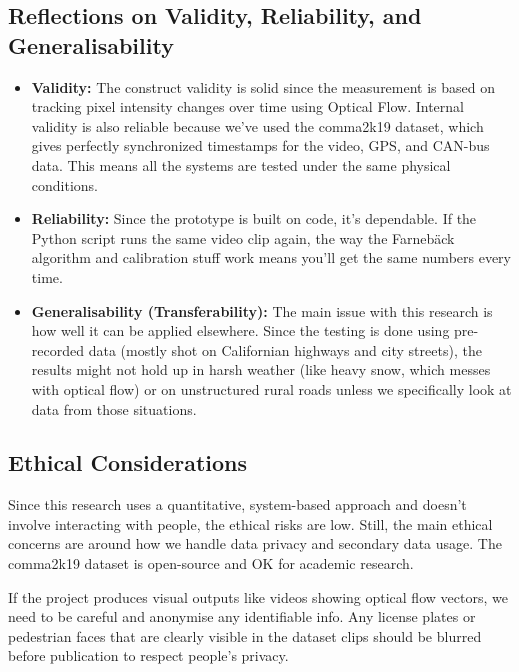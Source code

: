 \subsection{Reflections on Validity, Reliability, and Generalisability}
\begin{itemize}
    \item \textbf{Validity:} The construct validity is solid since the measurement is based on tracking pixel intensity changes over time using Optical Flow. Internal validity is also reliable because we’ve used the comma2k19 dataset, which gives perfectly synchronized timestamps for the video, GPS, and CAN-bus data. This means all the systems are tested under the same physical conditions.
    \item \textbf{Reliability:} Since the prototype is built on code, it's dependable. If the Python script runs the same video clip again, the way the Farnebäck algorithm and calibration stuff work means you'll get the same numbers every time.
    \item \textbf{Generalisability (Transferability):} The main issue with this research is how well it can be applied elsewhere. Since the testing is done using pre-recorded data (mostly shot on Californian highways and city streets), the results might not hold up in harsh weather (like heavy snow, which messes with optical flow) or on unstructured rural roads unless we specifically look at data from those situations.
\end{itemize}

\subsection{Ethical Considerations}
Since this research uses a quantitative, system-based approach and doesn't involve interacting with people, the ethical risks are low. Still, the main ethical concerns are around how we handle data privacy and secondary data usage. The comma2k19 dataset is open-source and OK for academic research. 

If the project produces visual outputs like videos showing optical flow vectors, we need to be careful and anonymise any identifiable info. Any license plates or pedestrian faces that are clearly visible in the dataset clips should be blurred before publication to respect people's privacy.